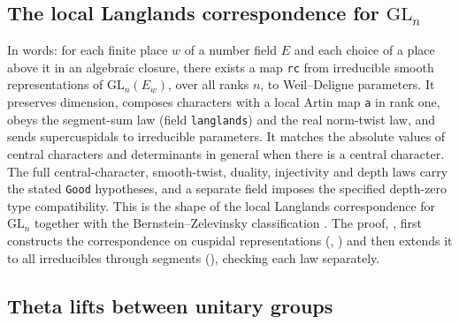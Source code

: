 \subsection{The local Langlands correspondence for \texorpdfstring{$\mathrm{GL}_n$}{GL(n)}}\label{sec:llc}

\noindent In words: for each finite place $w$ of a number field $E$ and each choice of a place above
it in an algebraic closure, there exists a map \texttt{rc} from irreducible smooth representations of
$\mathrm{GL}_n(E_w)$, over all ranks $n$, to Weil--Deligne parameters. It preserves dimension,
composes characters with a local Artin map \texttt{a} in rank one, obeys the segment-sum law (field
\texttt{langlands}) and the real norm-twist law, and sends supercuspidals to irreducible parameters.
It matches the absolute values of central characters and determinants in general when there is a
central character. The full central-character, smooth-twist, duality, injectivity and depth laws
carry the stated \texttt{Good} hypotheses, and a separate field imposes the specified depth-zero type
compatibility.
This is the shape of the local Langlands correspondence for $\mathrm{GL}_n$
 together with the Bernstein--Zelevinsky classification
 \sti. The proof,
,
first constructs the correspondence on cuspidal representations (,
)
and then extends it to all irreducibles through segments
(), checking each law separately.

\subsection{Theta lifts between unitary groups}\label{sec:theta}


